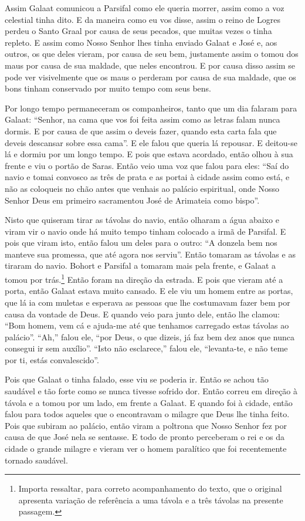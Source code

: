 Assim Galaat comunicou a Parsifal como ele queria morrer, assim como a voz
celestial tinha dito. E da maneira como eu vos disse, assim o reino de Logres
perdeu o Santo Graal por causa de seus pecados, que muitas vezes o tinha
repleto. E assim como Nosso Senhor lhes tinha enviado Galaat e
José e, aos outros, os que deles vieram, por causa de seu bem, justamente assim
o tomou dos maus por causa de sua maldade, que neles encontrou. E por causa
disso assim se pode ver visivelmente que os maus o perderam por causa de sua
maldade, que os bons tinham conservado por muito tempo com seus bens. 

Por longo tempo permaneceram os companheiros, tanto que um dia falaram para
Galaat: “Senhor, na cama que vos foi feita assim como as letras falam nunca
dormis. E por causa de que assim o deveis fazer, quando esta carta fala que
deveis descansar sobre essa cama”. E ele falou que queria lá repousar. E
deitou-se lá e dormiu por um longo tempo. E pois que estava acordado, então
olhou à sua frente e viu o portão de Saras. Então veio uma voz que falou para
eles: “Saí do navio e tomai convosco as três de prata e as portai à cidade
assim como está, e não as coloqueis no chão antes que venhais ao palácio
espiritual, onde Nosso Senhor Deus em primeiro sacramentou José de Arimateia
como bispo”. 

Nisto que quiseram tirar as távolas do navio, então olharam a água abaixo e
viram vir o navio onde há muito tempo tinham colocado a irmã de Parsifal. E
pois que viram isto, então falou um deles para o outro: “A donzela bem nos
manteve sua promessa, que até agora nos serviu”. Então tomaram as
távolas e as tiraram do navio. Bohort e Parsifal a tomaram mais pela frente, e
Galaat a tomou por trás.\footnote{ Importa ressaltar, para correto
acompanhamento do texto, que o original apresenta variação de referência a uma
távola e a três távolas na presente passagem.} Então foram na
direção da estrada. E pois que vieram até a porta, então Galaat estava muito
cansado. E ele viu um homem entre as portas, que lá ia com muletas e esperava
as pessoas que lhe costumavam fazer bem por causa da vontade de Deus. E quando
veio para junto dele, então lhe clamou: “Bom homem, vem cá e ajuda-me até que
tenhamos carregado estas távolas ao palácio”. “Ah,” falou ele, “por Deus, o que
dizeis, já faz bem dez anos que nunca consegui ir sem auxílio”. “Isto não
esclarece,” falou ele, “levanta-te, e não teme por ti, estás convalescido”. 

Pois que Galaat o tinha falado, esse viu se poderia ir. Então se achou tão
saudável e tão forte como se nunca tivesse sofrido dor. Então correu em direção
à távola e a tomou por um lado, em frente a Galaat. E quando foi à cidade, então
falou para todos aqueles que o encontravam o milagre que Deus lhe tinha feito.
Pois que subiram ao palácio, então viram a poltrona que Nosso Senhor fez por
causa de que José nela se sentasse. E todo de pronto perceberam o rei
e os da cidade o grande milagre e vieram ver o homem paralítico que foi
recentemente tornado saudável.

